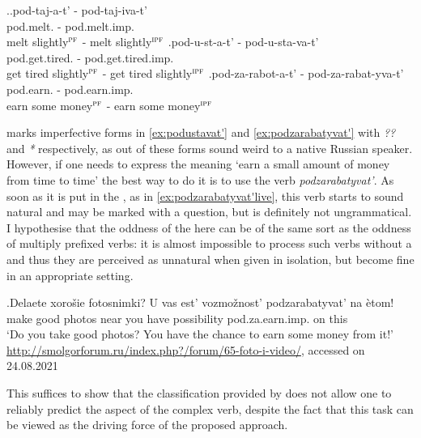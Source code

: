 \ex.\label{ex:pod}\ag.pod-taj-a-t' - pod-taj-iva-t'\\
pod.melt. - pod.melt.imp.\\
melt slightly$^{\textsc{pf}}$ - melt slightly$^{\textsc{ipf}}$
\bg.\label{ex:podustavat'}pod-u-st-a-t' - pod-u-sta-va-t'\\
pod.get.tired. - pod.get.tired.imp.\\
get tired slightly$^{\textsc{pf}}$ - get tired slightly$^{\textsc{ipf}}$
\bg.\label{ex:podzarabatyvat'}pod-za-rabot-a-t' - pod-za-rabat-yva-t'\\
pod.earn. - pod.earn.imp.\\
earn some money$^{\textsc{pf}}$ - earn some money$^{\textsc{ipf}}$

\citet{Kagan:book} marks imperfective forms in \ref{ex:podustavat'} and \ref{ex:podzarabatyvat'} with \textit{??} and \textit{*} respectively, as out of  these forms sound weird to a native Russian speaker. However, if one needs to express the meaning `earn a small amount of money from time to time' the best way to do it is to use the verb \textit{podzarabatyvat'}. As soon as it is put in the , as in \ref{ex:podzarabatyvat'live}, this verb starts to sound natural and may be marked with a question, but is definitely not ungrammatical. I hypothesise that the oddness of the  here can be of the same sort as the oddness of multiply prefixed verbs: it is almost impossible to process such verbs without a  and thus they are perceived as unnatural when given in isolation, but become fine in an appropriate setting.

\exg.\label{ex:podzarabatyvat'live}Delaete xoro\v{s}ie fotosnimki? U vas est' vozmo\v{z}nost' podzarabatyvat' na \`{e}tom!\\
make good photos near you have possibility pod.za.earn.imp. on this\\
\trans `Do you take good photos? You have the chance to earn some money from it!' \url{http://smolgorforum.ru/index.php?/forum/65-foto-i-video/}, accessed on 24.08.2021

This suffices to show that the classification provided by \citet{Tatevosov:07} does not allow one to reliably predict the aspect of the complex verb, despite the fact that this task can be viewed as the driving force of the proposed approach. 

